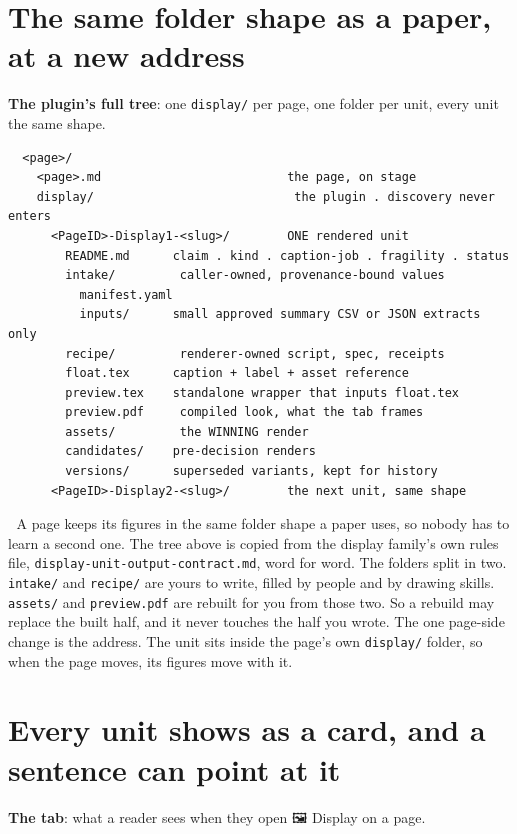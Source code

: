 
\section{The same folder shape as a paper, at a new address}
\textbf{The plugin's full tree}: one \texttt{display/} per page, one folder per unit, every unit the same shape.

\begin{verbatim}
  <page>/
    <page>.md                          the page, on stage
    display/                            the plugin . discovery never enters
      <PageID>-Display1-<slug>/        ONE rendered unit
        README.md      claim . kind . caption-job . fragility . status
        intake/         caller-owned, provenance-bound values
          manifest.yaml
          inputs/      small approved summary CSV or JSON extracts only
        recipe/         renderer-owned script, spec, receipts
        float.tex      caption + label + asset reference
        preview.tex    standalone wrapper that inputs float.tex
        preview.pdf     compiled look, what the tab frames
        assets/         the WINNING render
        candidates/    pre-decision renders
        versions/      superseded variants, kept for history
      <PageID>-Display2-<slug>/        the next unit, same shape
\end{verbatim}
📌 A page keeps its figures in the same folder shape a paper uses, so nobody has to learn a second one. The tree above is copied from the display family's own rules file, \texttt{display-unit-output-contract.md}, word for word. The folders split in two. \texttt{intake/} and \texttt{recipe/} are yours to write, filled by people and by drawing skills. \texttt{assets/} and \texttt{preview.pdf} are rebuilt for you from those two. So a rebuild may replace the built half, and it never touches the half you wrote. The one page-side change is the address. The unit sits inside the page's own \texttt{display/} folder, so when the page moves, its figures move with it.


\section{Every unit shows as a card, and a sentence can point at it}
\textbf{The tab}: what a reader sees when they open 🖼 Display on a page.

